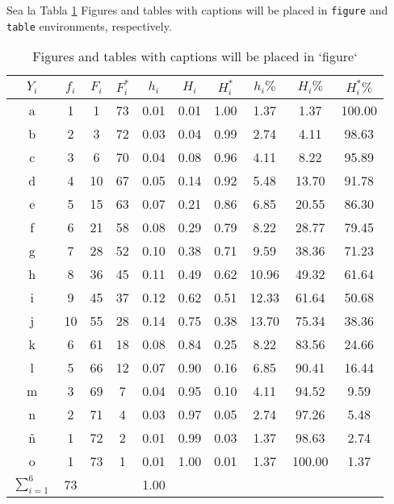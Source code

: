 \documentclass[10pt,]{krantz}
\theoremstyle{definition}
\theoremstyle{definition}
\theoremstyle{definition}
\theoremstyle{remark}
\begin{document}
Sea la Tabla \ref{tab:2w3} Figures and tables with captions will be placed in \texttt{figure} and \texttt{table} environments, respectively.

\begin{longtable}[t]{cccccccccc}
\caption{\label{tab:2w3}Figures and tables with captions will be placed in `figure`}\\
\toprule
$Y_i$ & $f_i$ & $F_i$ & $F_i^*$ & $h_i$ & $H_i$ & $H_i^*$ & $h_i\%$ & $H_i\%$ & $H_i^*\%$\\
\midrule
a & 1 & 1 & 73 & 0.01 & 0.01 & 1.00 & 1.37 & 1.37 & 100.00\\
b & 2 & 3 & 72 & 0.03 & 0.04 & 0.99 & 2.74 & 4.11 & 98.63\\
c & 3 & 6 & 70 & 0.04 & 0.08 & 0.96 & 4.11 & 8.22 & 95.89\\
d & 4 & 10 & 67 & 0.05 & 0.14 & 0.92 & 5.48 & 13.70 & 91.78\\
e & 5 & 15 & 63 & 0.07 & 0.21 & 0.86 & 6.85 & 20.55 & 86.30\\
f & 6 & 21 & 58 & 0.08 & 0.29 & 0.79 & 8.22 & 28.77 & 79.45\\
g & 7 & 28 & 52 & 0.10 & 0.38 & 0.71 & 9.59 & 38.36 & 71.23\\
h & 8 & 36 & 45 & 0.11 & 0.49 & 0.62 & 10.96 & 49.32 & 61.64\\
i & 9 & 45 & 37 & 0.12 & 0.62 & 0.51 & 12.33 & 61.64 & 50.68\\
j & 10 & 55 & 28 & 0.14 & 0.75 & 0.38 & 13.70 & 75.34 & 38.36\\
k & 6 & 61 & 18 & 0.08 & 0.84 & 0.25 & 8.22 & 83.56 & 24.66\\
l & 5 & 66 & 12 & 0.07 & 0.90 & 0.16 & 6.85 & 90.41 & 16.44\\
m & 3 & 69 & 7 & 0.04 & 0.95 & 0.10 & 4.11 & 94.52 & 9.59\\
n & 2 & 71 & 4 & 0.03 & 0.97 & 0.05 & 2.74 & 97.26 & 5.48\\
ñ & 1 & 72 & 2 & 0.01 & 0.99 & 0.03 & 1.37 & 98.63 & 2.74\\
o & 1 & 73 & 1 & 0.01 & 1.00 & 0.01 & 1.37 & 100.00 & 1.37\\
$\sum_{i=1}^6$ & 73 &  &  & 1.00 &  &  &  &  & \\
\bottomrule
\end{longtable}
\end{document}
